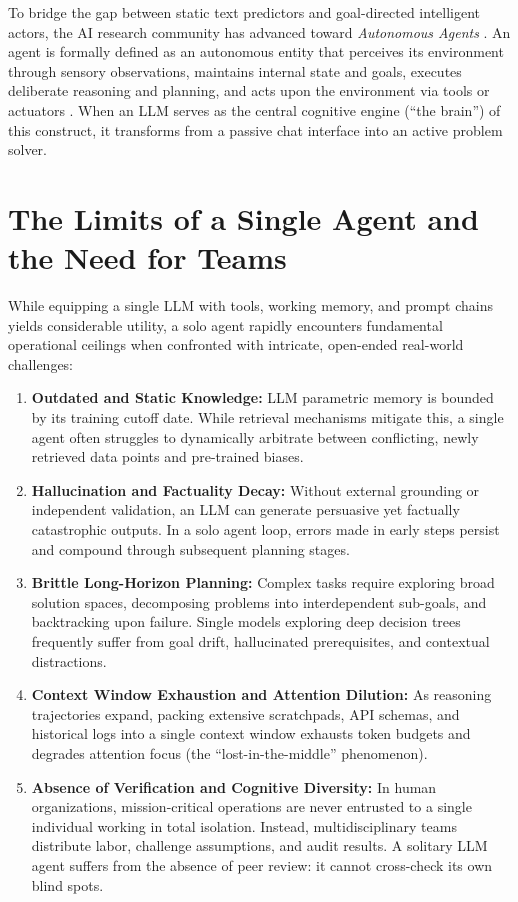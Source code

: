 \documentclass[12pt,a4paper]{report}
\begin{document}
To bridge the gap between static text predictors and goal-directed intelligent actors, the AI research community has advanced toward \textit{Autonomous Agents} \cite{xi2023rise, yao2023react}. An agent is formally defined as an autonomous entity that perceives its environment through sensory observations, maintains internal state and goals, executes deliberate reasoning and planning, and acts upon the environment via tools or actuators \cite{schick2024toolformer}. When an LLM serves as the central cognitive engine (``the brain'') of this construct, it transforms from a passive chat interface into an active problem solver.

\section{The Limits of a Single Agent and the Need for Teams}
While equipping a single LLM with tools, working memory, and prompt chains yields considerable utility, a solo agent rapidly encounters fundamental operational ceilings when confronted with intricate, open-ended real-world challenges:
\begin{enumerate}
    \item \textbf{Outdated and Static Knowledge:} LLM parametric memory is bounded by its training cutoff date. While retrieval mechanisms mitigate this, a single agent often struggles to dynamically arbitrate between conflicting, newly retrieved data points and pre-trained biases.
    \item \textbf{Hallucination and Factuality Decay:} Without external grounding or independent validation, an LLM can generate persuasive yet factually catastrophic outputs. In a solo agent loop, errors made in early steps persist and compound through subsequent planning stages.
    \item \textbf{Brittle Long-Horizon Planning:} Complex tasks require exploring broad solution spaces, decomposing problems into interdependent sub-goals, and backtracking upon failure. Single models exploring deep decision trees frequently suffer from goal drift, hallucinated prerequisites, and contextual distractions.
    \item \textbf{Context Window Exhaustion and Attention Dilution:} As reasoning trajectories expand, packing extensive scratchpads, API schemas, and historical logs into a single context window exhausts token budgets and degrades attention focus (the ``lost-in-the-middle'' phenomenon).
    \item \textbf{Absence of Verification and Cognitive Diversity:} In human organizations, mission-critical operations are never entrusted to a single individual working in total isolation. Instead, multidisciplinary teams distribute labor, challenge assumptions, and audit results. A solitary LLM agent suffers from the absence of peer review: it cannot cross-check its own blind spots.
\end{enumerate}
\end{document}
